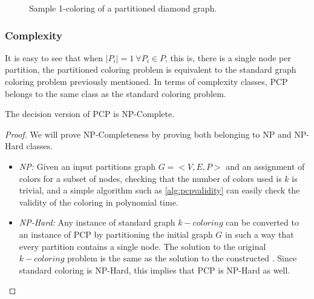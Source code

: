 \begin{figure}[h]
	\centering
\caption{Sample 1-coloring of a partitioned diamond graph.}
	\label{fig:samplepartitionedcoloring}
\end{figure}

\subsubsection{Complexity}

It is easy to see that when $|P_i| = 1\ \forall P_i \in P$, this is, there is a single node per partition, the partitioned coloring problem is equivalent to the standard graph coloring problem previously mentioned. In terms of complexity classes, PCP belongs to the same class as the standard coloring problem.

\begin{theorem}
The decision version of PCP is NP-Complete.
\end{theorem}

\begin{proof}
We will prove NP-Completeness by proving both belonging to NP and NP-Hard classes.

\begin{itemize}
\item{\textit{NP:} Given an input partitions graph $G = <V,E,P>$ and an assignment of colors for a subset of nodes, checking that the number of colors used is $k$ is trivial, and a simple algorithm such as \ref{alg:pcpvalidity} can easily check the validity of the coloring in polynomial time.}
\item{\textit{NP-Hard:} Any instance of standard graph $k-coloring$ can be converted to an instance of PCP by partitioning the initial graph $G$ in such a way that every partition contains a single node. The solution to the original $k-coloring$ problem is the same as the solution to the constructed \PCP{}. Since standard coloring is NP-Hard, this implies that PCP is NP-Hard as well.}
\end{itemize}

\end{proof}

